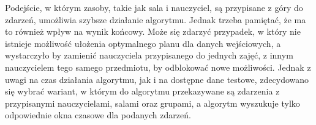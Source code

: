 Podejście, w którym zasoby, takie jak sala i nauczyciel, są przypisane z góry do zdarzeń, umożliwia szybsze działanie algorytmu. Jednak trzeba pamiętać, że ma to również wpływ na wynik końcowy. Może się zdarzyć przypadek, w który nie istnieje możliwość ułożenia optymalnego planu dla danych wejściowych, a wystarczyło by zamienić nauczyciela przypisanego do jednych zajęć, z innym nauczycielem tego samego przedmiotu, by odblokować nowe możliwości. Jednak z uwagi na czas działania algorytmu, jak i na dostępne dane testowe, zdecydowano się wybrać wariant, w którym do algorytmu przekazywane są zdarzenia z przypisanymi nauczycielami, salami oraz grupami, a algorytm wyszukuje tylko odpowiednie okna czasowe dla podanych zdarzeń.